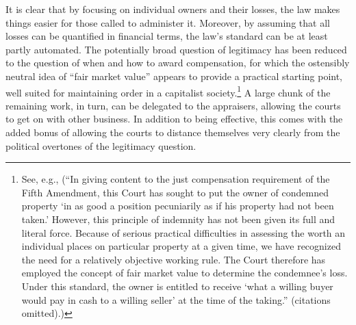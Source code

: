 It is clear that by focusing on individual owners and their losses, the law makes things easier for those called to administer it. Moreover, by assuming that all losses can be quantified in financial terms, the law's standard can be at least partly automated. The potentially broad question of legitimacy has been reduced to the question of when and how to award compensation, for which the ostensibly neutral idea of ``fair market value'' appears to provide a practical starting point, well suited for maintaining order in a capitalist society.\footnote{See, e.g., \cite[510-511]{acres79} (``In giving content to the just compensation requirement of the Fifth Amendment, this Court has sought to put the owner of condemned property `in as good a position pecuniarily as if his property had not been taken.' However, this principle of indemnity has not been given its full and literal force. Because of serious practical difficulties in assessing the worth an individual places on particular property at a given time, we have recognized the need for a relatively objective working rule. The Court therefore has employed the concept of fair market value to determine the condemnee's loss. Under this standard, the owner is entitled to receive `what a willing buyer would pay in cash to a willing seller' at the time of the taking.'' (citations omitted).)} A large chunk of the remaining work, in turn, can be delegated to the appraisers, allowing the courts to get on with other business. In addition to being effective, this comes with the added bonus of allowing the courts to distance themselves very clearly from the political overtones of the legitimacy question.

